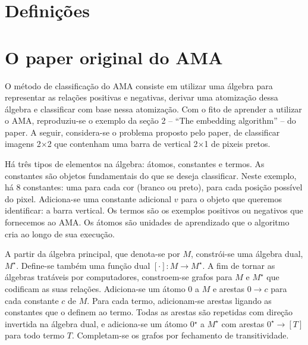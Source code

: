 \documentclass[12pt]{article}
\begin{document}
\section{Definições}

\section{O paper original do AMA}

O método de classificação do AMA consiste em utilizar uma álgebra para representar as relações positivas e negativas, derivar uma atomização dessa álgebra e classificar com base nessa atomização. Com o fito de aprender a utilizar o AMA, reproduziu-se o exemplo da seção 2 -- ``The embedding algorithm'' -- do paper. A seguir, considera-se o problema proposto pelo paper, de classificar imagens 2$\times$2 que contenham uma barra de vertical 2$\times$1 de pixeis pretos.

Há três tipos de elementos na álgebra: átomos, constantes e termos.
As constantes são objetos fundamentais do que se deseja classificar. Neste exemplo, há 8 constantes: uma para cada cor (branco ou preto), para cada posição possível do pixel. Adiciona-se uma constante adicional $v$ para o objeto que queremos identificar: a barra vertical.
Os termos são os exemplos positivos ou negativos que fornecemos ao AMA. Os átomos são unidades de aprendizado que o algoritmo cria ao longo de sua execução.

A partir da álgebra principal, que denota-se por $M$, constrói-se uma álgebra dual, $M^{\star}$. Define-se também uma função dual $[\cdot]\colon M \to M^{\star}$. A fim de tornar as álgebras tratáveis por computadores, constroem-se grafos para $M$ e $M^{\star}$ que codificam as suas relações.
Adiciona-se um átomo 0 a $M$ e arestas $0 \to c$ para cada constante $c$ de $M$. Para cada termo, adicionam-se arestas ligando as constantes que o definem ao termo. Todas as arestas são repetidas com direção invertida na álgebra dual, e adiciona-se um átomo 0$^{\star}$ a $M^{\star}$ com arestas $0^{\star} \to [T]$ para todo termo $T$. Completam-se os grafos por fechamento de transitividade.



\end{document}
